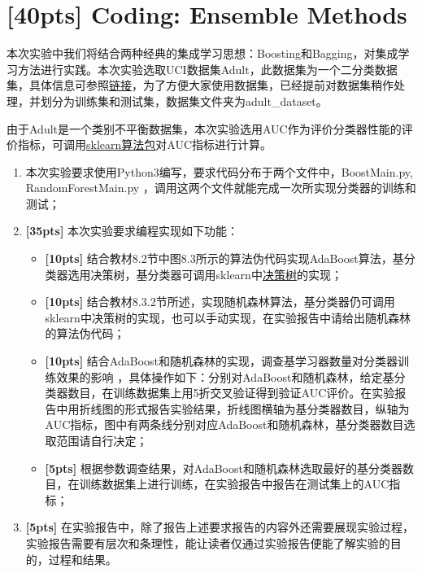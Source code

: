\documentclass[a4paper,UTF8]{article}
\theoremstyle{definition}
\begin{document}
\section{[40pts] Coding: Ensemble Methods }

本次实验中我们将结合两种经典的集成学习思想：Boosting和Bagging，对集成学习方法进行实践。本次实验选取UCI数据集Adult，此数据集为一个二分类数据集，具体信息可参照\href{http://archive.ics.uci.edu/ml/datasets/Adult}{链接}，为了方便大家使用数据集，已经提前对数据集稍作处理，并划分为训练集和测试集，数据集文件夹为adult\_dataset。

由于Adult是一个类别不平衡数据集，本次实验选用AUC作为评价分类器性能的评价指标，可调用\href{http://scikit-learn.org/stable/modules/generated/sklearn.metrics.roc_auc_score.html}{sklearn算法包}对AUC指标进行计算。

\begin{enumerate}[(1)]
	\item 本次实验要求使用Python3编写，要求代码分布于两个文件中，BoostMain.py, RandomForestMain.py ，调用这两个文件就能完成一次所实现分类器的训练和测试；
	
	\item \textbf{[35pts]} 本次实验要求编程实现如下功能：
	
	\begin{itemize}
		\item \textbf{[10pts]} 结合教材8.2节中图8.3所示的算法伪代码实现AdaBoost算法，基分类器选用决策树，基分类器可调用sklearn中\href{http://scikit-learn.org/stable/modules/generated/sklearn.tree.DecisionTreeClassifier.html}{决策树}的实现；
		\item \textbf{[10pts]} 结合教材8.3.2节所述，实现随机森林算法，基分类器仍可调用sklearn中决策树的实现，也可以手动实现，在实验报告中请给出随机森林的算法伪代码；
		\item \textbf{[10pts]} 结合AdaBoost和随机森林的实现，调查基学习器数量对分类器训练效果的影响 ，具体操作如下：分别对AdaBoost和随机森林，给定基分类器数目，在训练数据集上用5折交叉验证得到验证AUC评价。在实验报告中用折线图的形式报告实验结果，折线图横轴为基分类器数目，纵轴为AUC指标，图中有两条线分别对应AdaBoost和随机森林，基分类器数目选取范围请自行决定；
		\item \textbf{[5pts]} 根据参数调查结果，对AdaBoost和随机森林选取最好的基分类器数目，在训练数据集上进行训练，在实验报告中报告在测试集上的AUC指标；
	\end{itemize}
	
	\item \textbf{[5pts]} 在实验报告中，除了报告上述要求报告的内容外还需要展现实验过程，实验报告需要有层次和条理性，能让读者仅通过实验报告便能了解实验的目的，过程和结果。
	
\end{enumerate}
\end{document}
